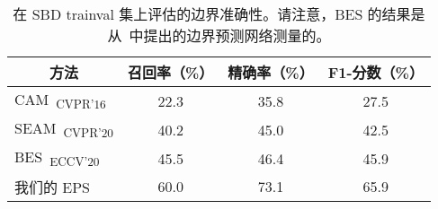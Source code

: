 \begin{table}[]
\centering
{\small
\begin{tabular}{@{}lccc@{}}
\toprule
\multicolumn{1}{c}{方法}                      & 召回率（\%） & 精确率（\%） & F1-分数（\%） \\ \midrule
\multicolumn{1}{l}{CAM~\cite{zhou2016learning}\textsubscript{CVPR'16}} & 22.3        & 35.8           & 27.5           \\
\multicolumn{1}{l}{SEAM~\cite{wang2020self}\textsubscript{CVPR'20}}    & 40.2        & 45.0           & 42.5           \\
\multicolumn{1}{l}{BES~\cite{chen2020boundary}\textsubscript{ECCV'20}} & 45.5        & 46.4           & 45.9           \\
\multicolumn{1}{l}{我们的 EPS}                        & 60.0        & 73.1          & 65.9           \\ \bottomrule
\end{tabular}
}
\vspace{2mm}
\caption{在 SBD trainval 集上评估的边界准确性。请注意，BES 的结果是从~\cite{chen2020boundary}中提出的边界预测网络测量的。} \vspace{-2mm}
\label{tab:boundary}
\end{table}
